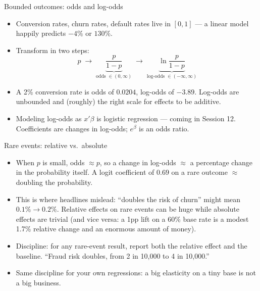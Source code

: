 \documentclass[aspectratio=169,11pt]{beamer}
\begin{document}
\begin{frame}{Bounded outcomes: odds and log-odds}
\begin{itemize}
	\item Conversion rates, churn rates, default rates live in $[0,1]$ --- a linear
	model happily predicts $-4\%$ or $130\%$.

	\medskip
	\item Transform in two steps:\[
	p \;\longrightarrow\; \underbrace{\frac{p}{1-p}}_{\text{odds } \in (0,\infty)}
	\;\longrightarrow\; \underbrace{\ln \frac{p}{1-p}}_{\text{log-odds } \in (-\infty,\infty)}
	\]

	\medskip
	\item A 2\% conversion rate is odds of $0.0204$, log-odds of $-3.89$.
	Log-odds are unbounded and (roughly) the right scale for effects to be additive.

	\medskip
	\item Modeling log-odds as $x'\beta$ \alert{is} logistic regression --- coming in
	Session 12. Coefficients are changes in log-odds; $e^{\beta}$ is an
	\alert{odds ratio}.
\end{itemize}
\end{frame}


\begin{frame}{Rare events: relative vs.\ absolute}
\begin{itemize}
	\item When $p$ is small, odds $\approx p$, so a change in log-odds
	$\approx$ a \alert{percentage change in the probability itself}. A logit
	coefficient of $0.69$ on a rare outcome $\approx$ doubling the probability.

	\medskip
	\item This is where headlines mislead: ``doubles the risk of churn'' might mean
	$0.1\% \rightarrow 0.2\%$. Relative effects on rare events can be huge while
	absolute effects are trivial (and vice versa: a 1pp lift on a 60\% base rate is a
	modest 1.7\% relative change and an enormous amount of money).

	\medskip
	\item Discipline: for any rare-event result, report \alert{both} the relative
	effect and the baseline. ``Fraud risk doubles, from 2 in 10{,}000 to 4 in
	10{,}000.''

	\medskip
	\item Same discipline for your own regressions: a big elasticity on a tiny base
	is not a big business.
\end{itemize}
\end{frame}
\end{document}
